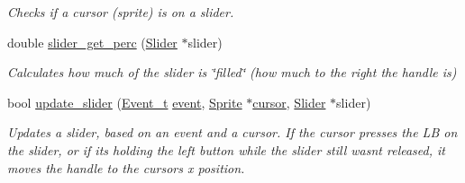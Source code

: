 \begin{DoxyCompactItemize}
\begin{DoxyCompactList}\small\item\em Checks if a cursor (sprite) is on a slider. \end{DoxyCompactList}\item 
double \mbox{\hyperlink{group__sprite_ga3ac8528c0dc7f14cd06be7fd636fd6d7}{slider\+\_\+get\+\_\+perc}} (\mbox{\hyperlink{struct_slider}{Slider}} $\ast$slider)
\begin{DoxyCompactList}\small\item\em Calculates how much of the slider is \char`\"{}filled\char`\"{} (how much to the right the handle is) \end{DoxyCompactList}\item 
bool \mbox{\hyperlink{group__sprite_ga912de7c5bbbc103cb804e3bd76ba770a}{update\+\_\+slider}} (\mbox{\hyperlink{struct_event__t}{Event\+\_\+t}} \mbox{\hyperlink{pengoo_8c_af662780d461acf9ac3b1321884e7cb01}{event}}, \mbox{\hyperlink{struct_sprite}{Sprite}} $\ast$\mbox{\hyperlink{pengoo_8c_a3a7ea4305773abf5347bb261a8a5c16b}{cursor}}, \mbox{\hyperlink{struct_slider}{Slider}} $\ast$slider)
\begin{DoxyCompactList}\small\item\em Updates a slider, based on an event and a cursor. If the cursor presses the LB on the slider, or if it\textquotesingle{}s holding the left button while the slider still wasn\textquotesingle{}t released, it moves the handle to the cursor\textquotesingle{}s x position. \end{DoxyCompactList}\end{DoxyCompactItemize}
